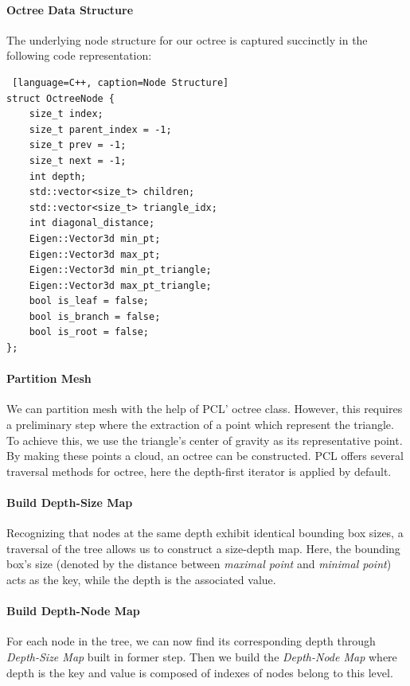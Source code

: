 \documentclass[11pt, a4paper,oneside,chapterprefix=false]{scrbook}
\begin{document}
\paragraph{Octree Data Structure}

The underlying node structure for our octree is captured succinctly in the following code representation:

\begin{lstlisting} [language=C++, caption=Node Structure]
struct OctreeNode {
    size_t index;
    size_t parent_index = -1;
    size_t prev = -1;
    size_t next = -1;
    int depth;
    std::vector<size_t> children;
    std::vector<size_t> triangle_idx;
    int diagonal_distance;
    Eigen::Vector3d min_pt;
    Eigen::Vector3d max_pt;
    Eigen::Vector3d min_pt_triangle;
    Eigen::Vector3d max_pt_triangle;
    bool is_leaf = false;
    bool is_branch = false;
    bool is_root = false;
};
\end{lstlisting}

\paragraph{Partition Mesh} \label{par:mesh octree}

We can partition mesh with the help of PCL' octree class. However, this requires a preliminary step where the extraction of a point which represent the triangle. To achieve this, we use the triangle's center of gravity as its representative point. By making these points a cloud, an octree can be constructed. PCL offers several traversal methods for octree, here the depth-first iterator is applied by default.

\paragraph{Build Depth-Size Map}

Recognizing that nodes at the same depth exhibit identical bounding box sizes, a traversal of the tree allows us to construct a size-depth map. Here, the bounding box's size (denoted by the distance between \emph{maximal point} and \emph{minimal point}) acts as the key, while the depth is the associated value.

\paragraph{Build Depth-Node Map}

For each node in the tree, we can now find its corresponding depth through \emph{Depth-Size Map} built in former step. Then we build the \emph{Depth-Node Map} where depth is the key and value is composed of indexes of nodes belong to this level.
\end{document}
